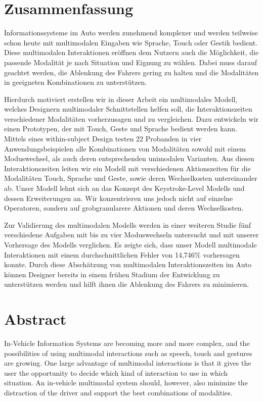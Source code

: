 \chapter*{Zusammenfassung}
Informationssysteme im Auto werden zunehmend komplexer und werden teilweise schon heute mit multimodalen Eingaben wie Sprache, Touch oder Gestik bedient.
Diese multimodalen Interaktionen eröffnen dem Nutzern auch die Möglichkeit, die passende Modalität je nach Situation und Eignung zu wählen.
Dabei muss darauf geachtet werden, die Ablenkung des Fahrers gering zu halten und die Modalitäten in geeigneten Kombinationen zu unterstützen.

Hierdurch motiviert erstellen wir in dieser Arbeit ein multimodales Modell, welches Designern multimodaler Schnittstellen helfen soll, die Interaktionszeiten verschiedener Modalitäten vorherzusagen und zu vergleichen.
Dazu entwickeln wir einen Prototypen, der mit Touch, Geste und Sprache bedient werden kann.
Mittels eines within-subject Design testen 22 Probanden in vier Anwendungsbeispielen alle Kombinationen von Modalitäten sowohl mit einem Moduswechsel, als auch deren entsprechenden unimodalen Varianten.
Aus diesen Interaktionszeiten leiten wir ein Modell mit verschiedenen Aktionszeiten für die Modalitäten Touch, Sprache und Geste, sowie deren Wechselkosten untereinander ab.
Unser Modell lehnt sich an das Konzept des Keystroke-Level Modells und dessen Erweiterungen an.
Wir konzentrieren uns jedoch nicht auf einzelne Operatoren, sondern auf grobgranularere Aktionen und deren Wechselkosten.

Zur Validierung des multimodalen Modells werden in einer weiteren Studie fünf verschiedene Aufgaben mit bis zu vier Moduswechseln untersucht und mit unserer Vorhersage des Modells verglichen.
Es zeigte sich, dass unser Modell multimodale Interaktionen mit einem durchschnittlichen Fehler von 14,746\% vorhersagen konnte.
Durch diese Abschätzung von multimodalen Interaktionszeiten im Auto können Designer bereits in einem frühen Stadium der Entwicklung zu unterstützen werden und hilft ihnen die Ablenkung des Fahrers zu minimieren.


\chapter*{Abstract}
In-Vehicle Information Systems are becoming more and more complex, and the possibilities of using multimodal interactions such as speech, touch and gestures are growing.
One large advantage of multimodal interactions is that it gives the user the opportunity to decide which kind of interaction to use in which situation. An in-vehicle multimodal system should, however, also minimize the distraction of the driver and support the best combinations of modalities.

